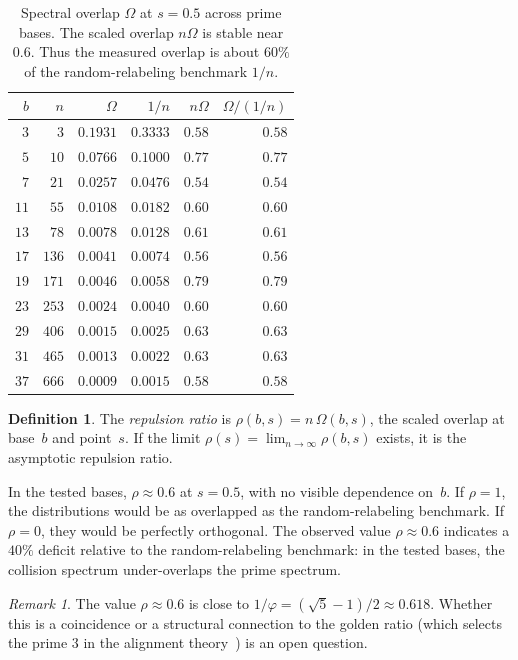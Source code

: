 \documentclass[12pt]{amsart}
\theoremstyle{definition}
\newtheorem{definition}[theorem]{Definition}
\theoremstyle{remark}
\newtheorem{remark}[theorem]{Remark}
\begin{document}
\begin{table}[h]
\centering
\begin{tabular}{rrrrrr}
\toprule
$b$ & $n$ & $\Omega$ & $1/n$ & $n\Omega$ &
$\Omega/(1/n)$ \\
\midrule
$3$ & $3$ & $0.1931$ & $0.3333$ & $0.58$ & $0.58$ \\
$5$ & $10$ & $0.0766$ & $0.1000$ & $0.77$ & $0.77$ \\
$7$ & $21$ & $0.0257$ & $0.0476$ & $0.54$ & $0.54$ \\
$11$ & $55$ & $0.0108$ & $0.0182$ & $0.60$ & $0.60$ \\
$13$ & $78$ & $0.0078$ & $0.0128$ & $0.61$ & $0.61$ \\
$17$ & $136$ & $0.0041$ & $0.0074$ & $0.56$ & $0.56$ \\
$19$ & $171$ & $0.0046$ & $0.0058$ & $0.79$ & $0.79$ \\
$23$ & $253$ & $0.0024$ & $0.0040$ & $0.60$ & $0.60$ \\
$29$ & $406$ & $0.0015$ & $0.0025$ & $0.63$ & $0.63$ \\
$31$ & $465$ & $0.0013$ & $0.0022$ & $0.63$ & $0.63$ \\
$37$ & $666$ & $0.0009$ & $0.0015$ & $0.58$ & $0.58$ \\
\bottomrule
\end{tabular}
\caption{Spectral overlap $\Omega$ at $s = 0.5$
across prime bases. The scaled overlap $n\Omega$ is
stable near $0.6$. Thus the measured overlap is about
$60\%$ of the random-relabeling benchmark $1/n$.}
\label{tab:overlap}
\end{table}

\begin{definition}
The \emph{repulsion ratio} is
$\rho(b,s) = n\,\Omega(b,s)$, the scaled overlap
at base~$b$ and point~$s$. If the limit
$\rho(s) = \lim_{n \to \infty} \rho(b,s)$ exists,
it is the asymptotic repulsion ratio.
\end{definition}

In the tested bases, $\rho \approx 0.6$ at $s = 0.5$,
with no visible dependence on~$b$. If $\rho = 1$, the distributions would be
as overlapped as the random-relabeling benchmark. If $\rho = 0$,
they would be perfectly orthogonal. The observed value
$\rho \approx 0.6$ indicates a $40\%$ deficit relative
to the random-relabeling benchmark: in the tested
bases, the collision spectrum under-overlaps the prime
spectrum.

\begin{remark}
The value $\rho \approx 0.6$ is close to
$1/\varphi = (\sqrt{5}-1)/2 \approx 0.618$. Whether
this is a coincidence or a structural connection to
the golden ratio (which selects the prime $3$ in the
alignment theory~\cite{paperA}) is an open question.
\end{remark}
\end{document}
